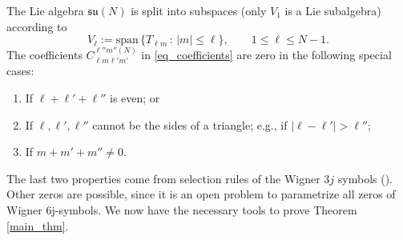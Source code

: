 \documentclass[11pt]{amsart}
\numberwithin{equation}{section}
\theoremstyle{definition}
\begin{document}
The Lie algebra $\mathfrak{su}(N)$ is split into subspaces (only $V_1$ is a Lie subalgebra) according to
$$V_{\ell} := \mathrm{span} \,\{ T_{\ell m} \, : \, |m| \leq \ell \}, \qquad 1 \leq \ell \leq N-1.$$
The coefficients $C_{\ell m\ell' m'}^{\ell'' m''(N)}$ in \eqref{eq_coefficients} are zero in the following special cases:
\begin{enumerate}
    \item If $\ell + \ell' + \ell''$ is even; or
    \item If $\ell,\ell',\ell''$ cannot be the sides of a triangle; e.g., if $|\ell-\ell'| > \ell''$; 
    \item If $m + m' + m'' \neq 0$.
\end{enumerate}
The last two properties come from selection rules of the Wigner $3j$ symbols (\cite{Varshalovich1988quantum}). Other zeros are possible, since it is an open problem to parametrize all zeros of Wigner $6$j-symbols.  We now have the necessary tools to prove Theorem \ref{main_thm}.
\end{document}
